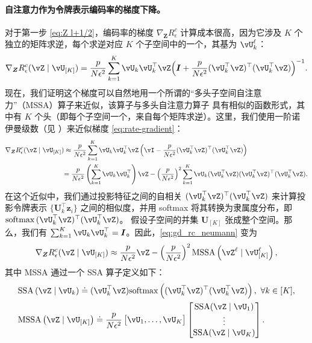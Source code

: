 \documentclass[../../book-main.tex]{subfiles}
\begin{document}
\paragraph{自注意力作为令牌表示编码率的梯度下降。} 对于第一步 \eqref{eq:Z l+1/2}，编码率的梯度 \(\nabla_{\bm Z} R^c_\epsilon\) 计算成本很高，因为它涉及 \(K\) 个独立的矩阵求逆，每个求逆对应 \(K\) 个子空间中的一个，其基为 \(\vU_{k}^{\ell}\)：
\begin{equation}
    \nabla_{\bm Z} R_{\epsilon}^c(\vZ \mid \vU_{[K]})
    = \frac{p}{N\epsilon^2}\sum_{k=1}^K \vU_k\vU_k^\top\vZ\Big(\I +
    \frac{p}{N\epsilon^2}(\vU_k^\top\vZ)^\top(\vU_k^\top\vZ)\Big)^{-1}.
    \label{eq:rate-gradient}
\end{equation}
现在，我们证明这个梯度可以自然地用一个所谓的“多头子空间自注意力”（MSSA）算子来近似，该算子与多头自注意力算子 \citep{vaswani2017attention} 具有相似的函数形式，其中有 \(K\) 个头（即每个子空间一个，来自每个矩阵求逆）。这里，我们使用一阶诺伊曼级数（见 ）来近似梯度 \eqref{eq:rate-gradient}：
\begin{align}\label{eq:gd_rc_neumann}
    \nabla_{\bm Z} R_{\epsilon}^{c}(\vZ \mid \vU_{[K]})
    &\approx \frac{p}{N\epsilon^2} \sum_{k = 1}^{K}\vU_{k}\vU_{k}^\top\vZ\left(\vI - \frac{p}{N\epsilon^2} (\vU_{k}^\top\vZ)^\top(\vU_{k}^\top\vZ)\right) \notag \\
    &{= \frac{p}{N\epsilon^2} \left(\sum_{k = 1}^{K} \vU_{k}\vU_{k}^\top\right)\vZ -  \left( \frac{p}{N\epsilon^2}\right)^2\sum_{k = 1}^{K} \vU_{k}(\vU_{k}^\top\vZ)(\vU_{k}^\top\vZ)^\top(\vU_{k}^\top\vZ)}.
\end{align}
在这个近似中，我们通过投影特征之间的自相关 $(\vU_{k}^\top\vZ)^\top(\vU_{k}^\top\vZ)$ 来计算投影令牌表示 $\{\bm U_k^\top\bm z_i\}$ 之间的相似度，并用 softmax 将其转换为隶属度分布，即 $\softmax{(\vU_{k}^\top\vZ)^\top(\vU_{k}^\top\vZ)}$。
假设子空间的并集 $\bm U_{[K]}$ 张成整个空间。那么，我们有 $\sum_{k = 1}^{K} \vU_{k}\vU_{k}^\top = \bm I$。因此，\eqref{eq:gd_rc_neumann} 变为
\begin{align}\label{eq:grad Rc}
    \nabla_{\bm Z} R_{\epsilon}^{c}(\vZ \mid \vU_{[K]})
     \approx  \frac{p}{N\epsilon^2} \vZ -  \left( \frac{p}{N\epsilon^2}\right)^2 \MSSA\left(\vZ^{\ell} \mid \vU_{[K]}^{\ell}\right),
\end{align}
其中 MSSA 通过一个 SSA 算子定义如下：
\begin{align}
    & \mathrm{SSA}\left(\vZ \mid \vU_{k}\right)
    \doteq (\vU_{k}^\top \vZ)\mathrm{softmax}\left((\vU_{k}^\top\vZ)^\top(\vU_{k}^\top\vZ)\right), \ \forall k \in [K], \label{eq:SSA} \\
    & \mathrm{MSSA}\left(\vZ \mid \vU_{[K]}\right)
    \doteq \frac{p}{N\epsilon^2} \mat{\vU_{1}, \dots, \vU_{K}}\mat{\mathrm{SSA}({\vZ \mid \vU_{1}}) \\ \vdots \\ \mathrm{SSA}({\vZ \mid \vU_{K}})}.\label{eq:Multi-Head-SSA}
\end{align}
\end{document}
